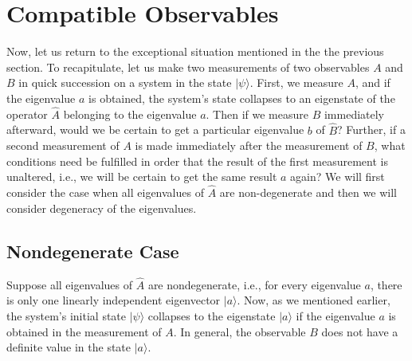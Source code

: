 
\section{Compatible Observables}
Now, let us return to the exceptional situation mentioned in the the previous section. To recapitulate, let us make two 
measurements of two observables $A$ and $B$ in quick succession on a system in the state $|\psi\rangle$. First, we measure $A$, and if the eigenvalue $a$ is obtained, the system's state collapses to an eigenstate of the operator $\hat{A}$ belonging to the eigenvalue $a$. Then if we measure $B$ immediately afterward, would we be certain to get a particular eigenvalue 
$b$ of $\hat{B}$? Further, if a second measurement of $A$ is made immediately after the measurement of $B$, what conditions need be fulfilled in order that the result of the first measurement is unaltered, i.e., we will be certain to get the same result $a$ again? We will first consider the case when all eigenvalues of $\hat{A}$  are non-degenerate and then we will consider degeneracy of the eigenvalues. 

\subsection {Nondegenerate Case}
Suppose all eigenvalues of $\hat{A}$ are nondegenerate, i.e., for every eigenvalue $a$, there is only one linearly independent eigenvector $|a\rangle$. Now, as we mentioned earlier, the system's initial state $|\psi\rangle$ collapses to the eigenstate 
$|a\rangle$ if the eigenvalue $a$ is obtained in the measurement of $A$. In general, the observable $B$ does not have a definite value in the state $|a\rangle$.

